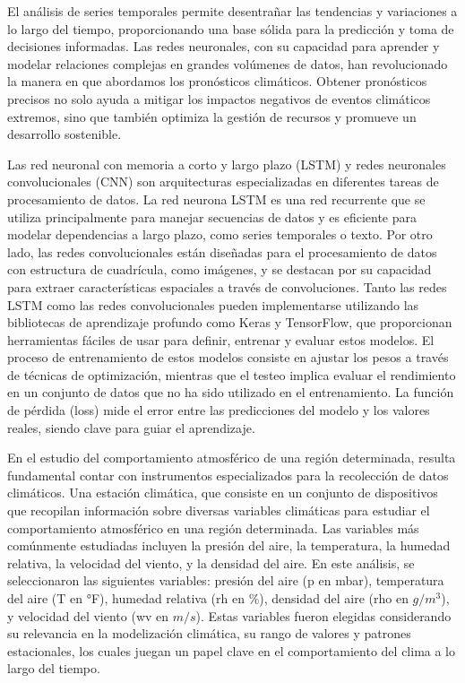 \documentclass[
  us-letterpaper,
]{scrreprt}
\theoremstyle{plain}
\theoremstyle{definition}
\theoremstyle{definition}
\theoremstyle{remark}
\begin{document}
El análisis de series temporales permite desentrañar las tendencias y
variaciones a lo largo del tiempo, proporcionando una base sólida para
la predicción y toma de decisiones informadas. Las redes neuronales, con
su capacidad para aprender y modelar relaciones complejas en grandes
volúmenes de datos, han revolucionado la manera en que abordamos los
pronósticos climáticos. Obtener pronósticos precisos no solo ayuda a
mitigar los impactos negativos de eventos climáticos extremos, sino que
también optimiza la gestión de recursos y promueve un desarrollo
sostenible.

Las red neuronal con memoria a corto y largo plazo (LSTM) y redes
neuronales convolucionales (CNN) son arquitecturas especializadas en
diferentes tareas de procesamiento de datos. La red neurona LSTM es una
red recurrente que se utiliza principalmente para manejar secuencias de
datos y es eficiente para modelar dependencias a largo plazo, como
series temporales o texto. Por otro lado, las redes convolucionales
están diseñadas para el procesamiento de datos con estructura de
cuadrícula, como imágenes, y se destacan por su capacidad para extraer
características espaciales a través de convoluciones. Tanto las redes
LSTM como las redes convolucionales pueden implementarse utilizando las
bibliotecas de aprendizaje profundo como Keras y TensorFlow, que
proporcionan herramientas fáciles de usar para definir, entrenar y
evaluar estos modelos. El proceso de entrenamiento de estos modelos
consiste en ajustar los pesos a través de técnicas de optimización,
mientras que el testeo implica evaluar el rendimiento en un conjunto de
datos que no ha sido utilizado en el entrenamiento. La función de
pérdida (loss) mide el error entre las predicciones del modelo y los
valores reales, siendo clave para guiar el aprendizaje.

En el estudio del comportamiento atmosférico de una región determinada,
resulta fundamental contar con instrumentos especializados para la
recolección de datos climáticos. Una estación climática, que consiste en
un conjunto de dispositivos que recopilan información sobre diversas
variables climáticas para estudiar el comportamiento atmosférico en una
región determinada. Las variables más comúnmente estudiadas incluyen la
presión del aire, la temperatura, la humedad relativa, la velocidad del
viento, y la densidad del aire. En este análisis, se seleccionaron las
siguientes variables: presión del aire (p en mbar), temperatura del aire
(T en °F), humedad relativa (rh en \(\%\)), densidad del aire (rho en
\(g/m^3\)), y velocidad del viento (wv en \(m/s\)). Estas variables
fueron elegidas considerando su relevancia en la modelización climática,
su rango de valores y patrones estacionales, los cuales juegan un papel
clave en el comportamiento del clima a lo largo del tiempo.
\end{document}
